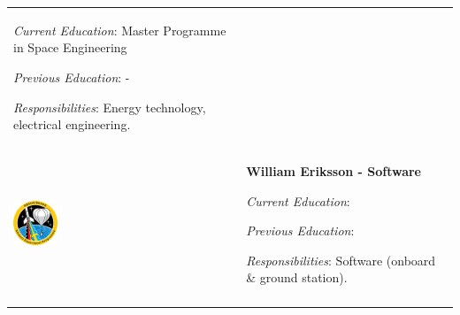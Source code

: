 \begin{longtable}[]{m{} m{}}
\smallskip
\textit{Current Education}: Master Programme in Space Engineering

\smallskip
\textit{Previous Education}: -

\smallskip
\textit{Responsibilities}: Energy technology, electrical engineering.
\bigskip
\\
 \includegraphics[width=0.2\textwidth]{0-cover/img/logo-rexus-bexus.png}  & \textbf{William Eriksson - Software}

\smallskip
\textit{Current Education}: 

\smallskip
\textit{Previous Education}:

\smallskip
\textit{Responsibilities}: Software (onboard \& ground station).
\bigskip
\\
\label{tab:people}
\end{longtable}
\raggedbottom

